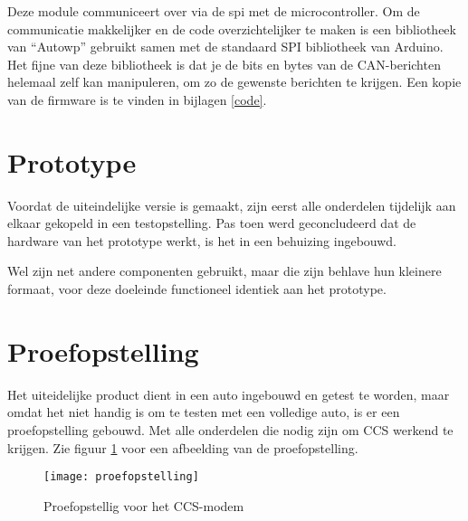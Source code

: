 Deze module communiceert over via de \ac{spi} met de microcontroller. Om de
communicatie makkelijker en de code overzichtelijker te maken is een
bibliotheek van ``Autowp'' \cite{autowp} gebruikt samen met de standaard SPI
bibliotheek van Arduino. Het fijne van deze bibliotheek is dat je de
bits en bytes van de CAN-berichten helemaal zelf kan manipuleren, om zo de
gewenste berichten te krijgen. Een kopie van de firmware is te vinden in
bijlagen \ref{code}.

\section{Prototype}

Voordat de uiteindelijke versie is gemaakt, zijn eerst alle onderdelen
tijdelijk aan elkaar gekopeld in een testopstelling. Pas toen werd
geconcludeerd dat de hardware van het prototype werkt, is het in een behuizing
ingebouwd.

Wel zijn net andere componenten gebruikt, maar die zijn behlave hun kleinere
formaat, voor deze doeleinde functioneel identiek aan het prototype.

\section{Proefopstelling}
\label{sec:proefopstelling}

Het uiteidelijke product dient in een auto ingebouwd en getest te worden, maar
omdat het niet handig is om te testen met een volledige auto, is er een
proefopstelling gebouwd. Met alle onderdelen die nodig zijn om CCS werkend te
krijgen. Zie figuur \ref{fig:proefopstelling} voor een afbeelding van de
proefopstelling.

\begin{figure}[]
    \centering
    \texttt{[image: proefopstelling]}
    \caption{Proefopstellig voor het CCS-modem}
    \label{fig:proefopstelling}
\end{figure}